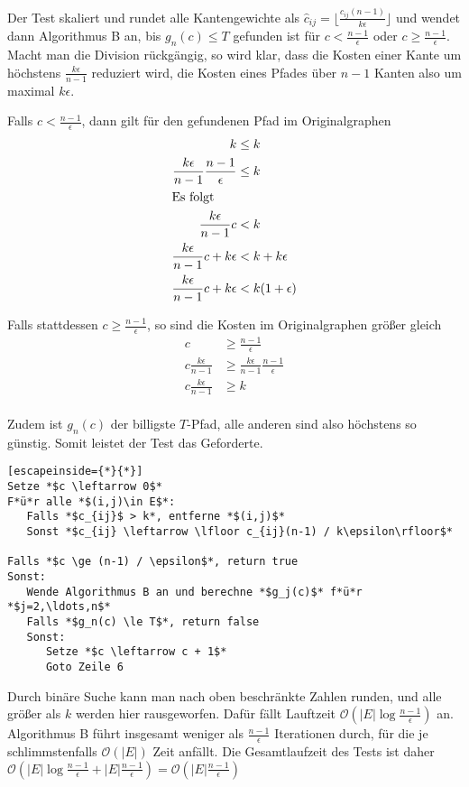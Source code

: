 \documentclass{article}
\begin{document}
Der Test skaliert und rundet alle Kantengewichte als $\hat{c}_{ij} =
\lfloor\frac{c_{ij} (n-1)}{k\epsilon}\rfloor$ und wendet dann Algorithmus B an,
bis $g_n(c) \le T$ gefunden ist für $c < \frac{n-1}{\epsilon}$ oder $c \ge
\frac{n-1}{\epsilon}$.
Macht man die Division rückgängig, so wird klar, dass die Kosten einer Kante um
höchstens $\frac{k\epsilon}{n-1}$ reduziert wird, die Kosten eines Pfades über
$n-1$ Kanten also um maximal $k\epsilon$.

Falls $c < \frac{n-1}{\epsilon}$, dann gilt für den gefundenen Pfad im
Originalgraphen
\begin{align*}
   k & \le k \\
   \frac{k\epsilon}{n-1} \frac{n-1}{\epsilon} & \le k \\
   \intertext{Es folgt}
   \frac{k\epsilon}{n-1} c & < k \\
   \frac{k\epsilon}{n-1} c + k\epsilon & < k + k\epsilon\\
   \frac{k\epsilon}{n-1} c + k\epsilon & < k(1+\epsilon)\\
\end{align*}

Falls stattdessen $c \ge \frac{n-1}{\epsilon}$, so sind die Kosten im
Originalgraphen größer gleich
\begin{align*}
   c & \ge \frac{n-1}{\epsilon} \\
   c \frac{k\epsilon}{n-1} & \ge \frac{k\epsilon}{n-1}\frac{n-1}{\epsilon} \\
   c \frac{k\epsilon}{n-1} & \ge k \\
\end{align*}

Zudem ist $g_n(c)$ der billigste $T$-Pfad, alle anderen sind also höchstens so
günstig.  Somit leistet der Test das Geforderte.

\begin{lstlisting}[escapeinside={*}{*}]
Setze *$c \leftarrow 0$*
F*ü*r alle *$(i,j)\in E$*:
   Falls *$c_{ij}$ > k*, entferne *$(i,j)$*
   Sonst *$c_{ij} \leftarrow \lfloor c_{ij}(n-1) / k\epsilon\rfloor$*

Falls *$c \ge (n-1) / \epsilon$*, return true
Sonst: 
   Wende Algorithmus B an und berechne *$g_j(c)$* f*ü*r *$j=2,\ldots,n$*
   Falls *$g_n(c) \le T$*, return false
   Sonst:
      Setze *$c \leftarrow c + 1$*
      Goto Zeile 6
\end{lstlisting}
 Durch binäre Suche kann man nach oben beschränkte Zahlen runden, und alle
 größer als $k$ werden hier rausgeworfen. Dafür fällt Lauftzeit
 $\mathcal{O}\left(|E|\log{\frac{n-1}{\epsilon}}\right)$ an. Algorithmus B führt insgesamt
 weniger als $\frac{n-1}{\epsilon}$ Iterationen durch, für die je
 schlimmstenfalls $\mathcal{O}\left(|E|\right)$ Zeit anfällt. Die Gesamtlaufzeit des Tests
 ist daher $\mathcal{O}\left(|E|\log{\frac{n-1}{\epsilon}} + |E|\frac{n-1}{\epsilon}\right)
 = \mathcal{O}\left(|E|\frac{n-1}{\epsilon}\right)
$
\end{document}
